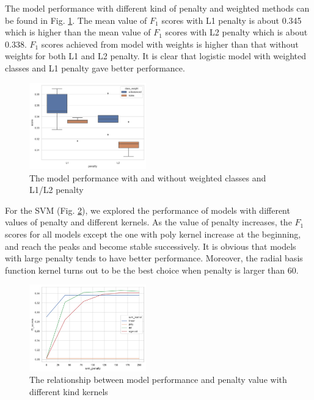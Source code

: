 \documentclass[compsoc]{IEEEtran}
\begin{document}
The model performance with different kind of penalty and weighted methods can be found in Fig.  \ref{fig:logistic}. The mean value of $F_1$ scores with L1 penalty is about 0.345 which is higher than the mean value of $F_1$ scores with L2 penalty which is about 0.338. $F_1$ scores achieved from model with weights is higher than that without weights for both L1 and L2 penalty. It is clear that logistic model with weighted classes and L1 penalty gave better performance.

\begin{figure}[htbp]
\centering
\includegraphics[width=0.45\textwidth]{logistic.png}
\caption{The model performance with and without weighted classes and L1/L2 penalty}
\label{fig:logistic}
\end{figure}

For the SVM (Fig. \ref{fig:penalty-svm}), we explored the performance of models with different values of penalty and different kernels. As the value of penalty increases, the $F_1$ scores for all models except the one with poly kernel increase at the beginning, and reach the peaks and become stable successively. It is obvious that models with large penalty tends to have better performance. Moreover, the radial basis function kernel turns out to be the best choice when penalty is larger than 60. 

\begin{figure}[htbp]
\centering
\includegraphics[width=0.45\textwidth]{penalty-svm.png}
\caption{The relationship between model performance and penalty value with different kind kernels}
\label{fig:penalty-svm}
\end{figure}
\end{document}
